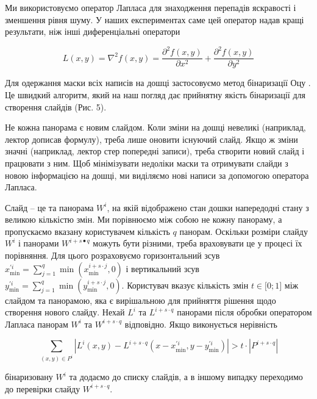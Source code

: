 Ми використовуємо оператор Лапласа  для знаходження перепадів
яскравості і зменшення рівня шуму. У наших експериментах саме цей
оператор надав кращі результати, ніж інші диференціальні оператори

\begin{equation}
L(x,y) = \nabla^{2}f(x,y) = \frac{\partial^{2}f(x,y)}{\partial x^{2}} + \frac{\partial^{2}f(x,y)}{\partial y^{2}}
\end{equation}

Для одержання маски всіх написів на дошці застосовуємо метод бінаризації
Оцу . Це швидкий алгоритм, який на наш погляд дає прийнятну
якість бінаризації для створення слайдів (Рис. 5).

Не кожна панорама є новим слайдом. Коли зміни на дошці невеликі
(наприклад, лектор дописав формулу), треба лише оновити існуючий слайд.
Якщо ж зміни значні (наприклад, лектор стер попередні записи), треба
створити новий слайд і працювати з ним. Щоб мінімізувати недоліки маски
та отримувати слайди з новою інформацією на дошці, ми виділяємо нові
написи за допомогою оператора Лапласа.

Слайд -- це та панорама \(W^{i}\), на якій відображено стан дошки
напередодні стану з великою кількістю змін. Ми порівнюємо між собою не
кожну панораму, а пропускаємо вказану користувачем кількість \(q\)
панорам. Оскільки розміри слайду \(W^{i}\) і панорами
\(W^{i + s \bullet q}\) можуть бути різними, треба враховувати це у
процесі їх порівняння. Для цього розраховуємо горизонтальний зсув
\(x_{\min}^{'i} = \sum_{j = 1}^{q}{\min\left( x_{\min}^{i + s \cdot j},0 \right)}\)
і вертикальний зсув
\(y_{\min}^{'i} = \sum_{j = 1}^{q}{\min\left( y_{\min}^{i + s \cdot j},0 \right)}\).
Користувач вказує кількість змін \(t \in \lbrack 0;1\rbrack\) між
слайдом та панорамою, яка є вирішальною для прийняття рішення щодо
створення нового слайду. Нехай \(L^{i}\) та \(L^{i + s \cdot q}\)
панорами після обробки оператором Лапласа панорам \(W^{i}\) та
\(W^{i + s \cdot q}\) відповідно. Якщо виконується нерівність

\begin{equation}
\sum_{(x,y) \in P^{i}}^{}| L^{i}(x,y) - L^{i + s \cdot q}( x - x_{\min}^{'i},y - y_{\min}^{'i} ) | > t \cdot | P^{i + s \cdot q} |
\end{equation}

бінаризовану \(W^{i}\) та додаємо до списку слайдів, а в іншому випадку переходимо до
перевірки слайду \(W^{i + s \cdot q}\).
